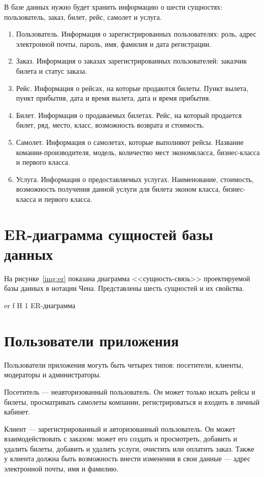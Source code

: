 \documentclass{bmstu}
\begin{document}
В базе данных нужно будет хранить информацию о шести сущностях: пользователь, заказ, билет, рейс, самолет и услуга.
\begin{enumerate}
\item Пользователь. 
Информация о зарегистрированных пользователях: роль, адрес электронной почты, пароль, имя, фамилия и дата регистрации.
\item Заказ. 
Информация о заказах зарегистрированных пользователей: заказчик билета и статус заказа.
\item Рейс. 
Информация о рейсах, на которые продаются билеты. 
Пункт вылета, пункт прибытия, дата и время вылета, дата и время прибытия.
\item Билет.
Информация о продаваемых билетах. 
Рейс, на который продается билет, ряд, место, класс, возможность возврата и стоимость. 
\item Самолет. 
Информация о самолетах, которые выполняют рейсы. 
Название комании-производителя, модель, количество мест экономкласса, бизнес-класса и первого класса.
\item Услуга. 
Информация о предоставляемых услугах. 
Наименование, стоимость, возможность получения данной услуги для билета эконом класса, бизнес-класса и первого класса.
\end{enumerate}

\section{ER-диаграмма сущностей базы данных}

На рисунке~\ref{img:er} показана диаграмма <<сущность-связь>> проектируемой базы данных в нотации Чена. 
Представлены шесть сущностей и их свойства.

    {er}
    {f}
    {H}
    {1\textwidth}
    {ER-диаграмма}
    
\section{Пользователи приложения}

Пользователи приложения могуть быть четырех типов: посетители, клиенты, модераторы и администраторы.

Посетитель --- неавторизованный пользователь. 
Он может только искать рейсы и билеты, просматривать самолеты компании, регистрироваться и входить в личный кабинет.

Клиент --- зарегистрированный и авторизованный пользователь. 
Он может взаимодействовать с заказом: может его создать и просмотреть, добавить и удалить билеты, добавить и удалить услуги, очистить или оплатить заказ. 
Также у клиента должна быть возможность внести изменения в свои данные --- адрес электронной почты, имя и фамилию. 
\end{document}
